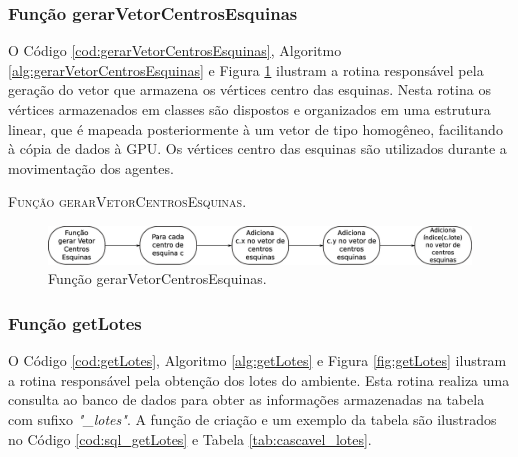 \newpage

\subsubsection{Função gerarVetorCentrosEsquinas}

O Código \ref{cod:gerarVetorCentrosEsquinas}, Algoritmo \ref{alg:gerarVetorCentrosEsquinas} e Figura \ref{fig:gerarVetorCentrosEsquinas} ilustram a rotina responsável pela geração do vetor que armazena os vértices centro das esquinas. Nesta rotina os vértices armazenados em classes são dispostos e organizados em uma estrutura linear, que é mapeada posteriormente à um vetor de tipo homogêneo, facilitando à cópia de dados à GPU. Os vértices centro das esquinas são utilizados durante a movimentação dos agentes. 

 

\begin{algorithm}[H]
   \SetAlgoLined   
   
   \caption{\textsc{Função gerarVetorCentrosEsquinas.}}
   \label{alg:gerarVetorCentrosEsquinas}
\end{algorithm}

\begin{figure}[H]
  \centering
  \includegraphics[width=1\textwidth]{Figuras/Simula/Fluxos/gerarVetorCentrosEsquinas.eps}
  \caption{Função gerarVetorCentrosEsquinas.}
  \label{fig:gerarVetorCentrosEsquinas}
\end{figure} 

\newpage

\subsubsection{Função getLotes}

O Código \ref{cod:getLotes}, Algoritmo \ref{alg:getLotes} e Figura \ref{fig:getLotes} ilustram a rotina responsável pela obtenção dos lotes do ambiente. Esta rotina realiza uma consulta ao banco de dados para obter as informações armazenadas na tabela com sufixo \textit{"\_lotes"}. A função de criação e um exemplo da tabela são ilustrados no Código \ref{cod:sql_getLotes} e Tabela \ref{tab:cascavel_lotes}.  

